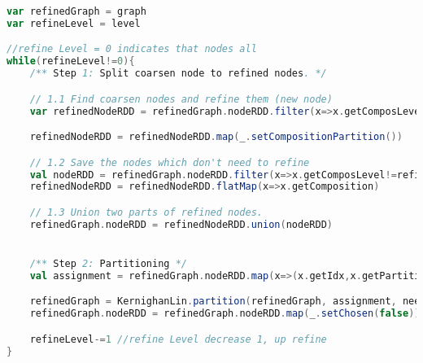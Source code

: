 \begin{lstlisting}[language=Scala]
var refinedGraph = graph
var refineLevel = level

//refine Level = 0 indicates that nodes all
while(refineLevel!=0){
    /** Step 1: Split coarsen node to refined nodes. */

    // 1.1 Find coarsen nodes and refine them (new node)
    var refinedNodeRDD = refinedGraph.nodeRDD.filter(x=>x.getComposLevel==refineLevel)

    refinedNodeRDD = refinedNodeRDD.map(_.setCompositionPartition())

    // 1.2 Save the nodes which don't need to refine
    val nodeRDD = refinedGraph.nodeRDD.filter(x=>x.getComposLevel!=refineLevel)
    refinedNodeRDD = refinedNodeRDD.flatMap(x=>x.getComposition)

    // 1.3 Union two parts of refined nodes.
    refinedGraph.nodeRDD = refinedNodeRDD.union(nodeRDD)


    /** Step 2: Partitioning */
    val assignment = refinedGraph.nodeRDD.map(x=>(x.getIdx,x.getPartition))

    refinedGraph = KernighanLin.partition(refinedGraph, assignment, needMaxGain = true)
    refinedGraph.nodeRDD = refinedGraph.nodeRDD.map(_.setChosen(false))

    refineLevel-=1 //refine Level decrease 1, up refine
}
\end{lstlisting}
